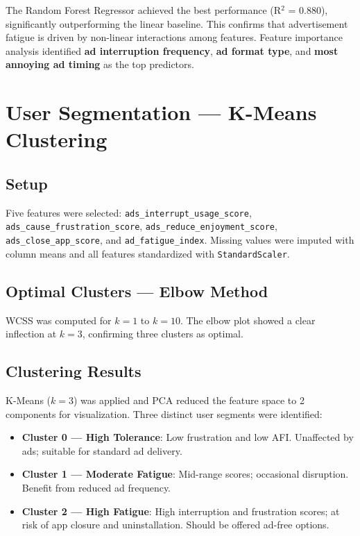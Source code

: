 \documentclass[12pt]{article}
\begin{document}
The Random Forest Regressor achieved the best performance (R$^2$ = 0.880), significantly outperforming the linear baseline. This confirms that advertisement fatigue is driven by non-linear interactions among features. Feature importance analysis identified \textbf{ad interruption frequency}, \textbf{ad format type}, and \textbf{most annoying ad timing} as the top predictors.

\section{User Segmentation — K-Means Clustering}

\subsection{Setup}

Five features were selected: \texttt{ads\_interrupt\_usage\_score}, \texttt{ads\_cause\_frustration\_score}, \texttt{ads\_reduce\_enjoyment\_score}, \texttt{ads\_close\_app\_score}, and \texttt{ad\_fatigue\_index}. Missing values were imputed with column means and all features standardized with \texttt{StandardScaler}.

\subsection{Optimal Clusters — Elbow Method}

WCSS was computed for $k = 1$ to $k = 10$. The elbow plot showed a clear inflection at $k = 3$, confirming three clusters as optimal.

\subsection{Clustering Results}

K-Means ($k = 3$) was applied and PCA reduced the feature space to 2 components for visualization. Three distinct user segments were identified:

\begin{itemize}
    \item \textbf{Cluster 0 — High Tolerance}: Low frustration and low AFI. Unaffected by ads; suitable for standard ad delivery.
    \item \textbf{Cluster 1 — Moderate Fatigue}: Mid-range scores; occasional disruption. Benefit from reduced ad frequency.
    \item \textbf{Cluster 2 — High Fatigue}: High interruption and frustration scores; at risk of app closure and uninstallation. Should be offered ad-free options.
\end{itemize}
\end{document}

